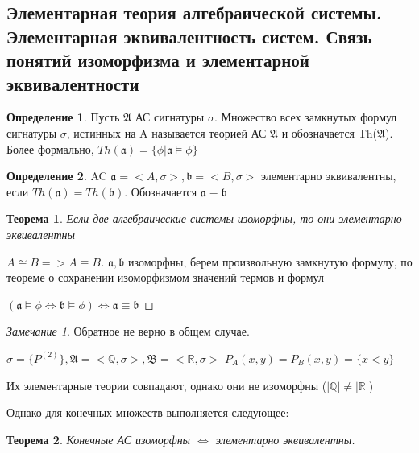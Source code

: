 \documentclass[a4paper]{article}
\newtheorem{theorem}{Теорема}[section]
\theoremstyle{definition}
\newtheorem*{definition}{Определение}
\theoremstyle{remark}
\newtheorem*{remark}{Замечание}
\begin{document}
    \subsection{Элементарная теория алгебраической системы. Элементарная эквивалентность систем. Связь понятий изоморфизма и элементарной эквивалентности}
    \begin{definition}
        Пусть $\mathfrak{A}$ АС сигнатуры $\sigma$. Множество всех замкнутых формул
        сигнатуры $\sigma$, истинных на A называется теорией АС $\mathfrak{A}$ и обозначается Th($\mathfrak{A}$).
        Более формально,
        $Th(\mathfrak{a}) = \{\phi|\mathfrak{a} \models \phi\}$
    \end{definition}
    \begin{definition}
        AC $\mathfrak{a} = <A, \sigma>, \mathfrak{b} = <B, \sigma>$ элементарно эквивалентны, если
        $Th(\mathfrak{a}) = Th(\mathfrak{b})$. Обозначается $\mathfrak{a}\equiv \mathfrak{b}$
    \end{definition}
    \begin{theorem}
        Если две алгебраические системы изоморфны, то они элементарно эквивалентны
    \end{theorem}
    \begin{proof}[$A\cong B => A\equiv B$]
        $\mathfrak{a}, \mathfrak{b}$ изоморфны, берем произвольную замкнутую формулу, по теореме о сохранении изоморфизмом значений термов и формул

        $(\mathfrak{a}\models \phi \Leftrightarrow \mathfrak{b}\models \phi) \Leftrightarrow \mathfrak{a} \equiv \mathfrak{b}$
    \end{proof}
    \begin{remark}
        Обратное не верно в общем случае.
        
        $\sigma = \{P^{(2)}\}, \mathfrak{A} = <\mathbb{Q}, \sigma>, \mathfrak{B} = <\mathbb{R}, \sigma>$
        $P_A(x, y) = P_B(x, y) = \{x < y\}$

        Их элементарные теории совпадают, однако они не изоморфны ($|\mathbb{Q} |\neq |\mathbb{R} |$)

        Однако для конечных множеств выполняется следующее:
    \end{remark}
    \begin{theorem}
        Конечные АС изоморфны $\Leftrightarrow$ элементарно эквивалентны.
    \end{theorem}
\end{document}
